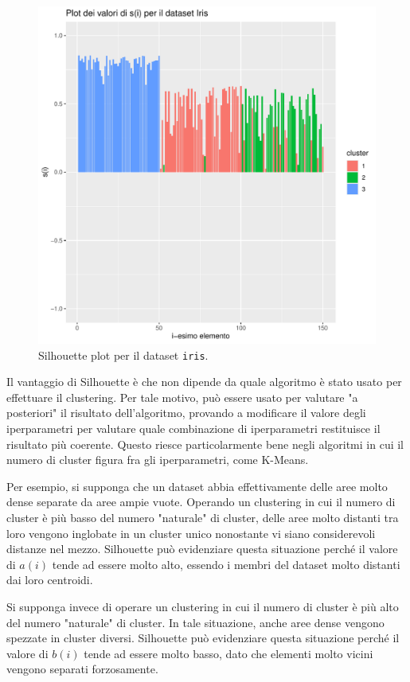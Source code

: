 \documentclass[12pt]{report}
\begin{document}
			\begin{figure}[h]
				\includegraphics[width = \textwidth]{doc/si.pdf}
				\caption{Silhouette plot per il dataset \texttt{iris}.}
				\label{fig:si}
			\end{figure}

			Il vantaggio di Silhouette è che non dipende da quale algoritmo
			è stato usato per effettuare il clustering. Per tale motivo, può
			essere usato per valutare "a posteriori" il risultato dell'algoritmo,
			provando a modificare il valore degli iperparametri per valutare
			quale combinazione di iperparametri restituisce il risultato più
			coerente. Questo riesce particolarmente bene negli algoritmi in
			cui il numero di cluster figura fra gli iperparametri, come K-Means.

			Per esempio, si supponga che un dataset abbia effettivamente
			delle aree molto dense separate da aree ampie vuote. Operando
			un clustering in cui il numero di cluster è più basso del numero
			"naturale" di cluster, delle aree molto distanti tra loro vengono
			inglobate in un cluster unico nonostante vi siano considerevoli
			distanze nel mezzo. Silhouette può evidenziare questa situazione
			perché il valore di $a(i)$ tende ad essere molto alto, essendo
			i membri del dataset molto distanti dai loro centroidi.

			Si supponga invece di operare un clustering in cui il numero
			di cluster è più alto del numero "naturale" di cluster. In tale
			situazione, anche aree dense vengono spezzate in cluster diversi.
			Silhouette può evidenziare questa situazione perché il valore di
			$b(i)$ tende ad essere molto basso, dato che elementi molto vicini
			vengono separati forzosamente.
\end{document}
